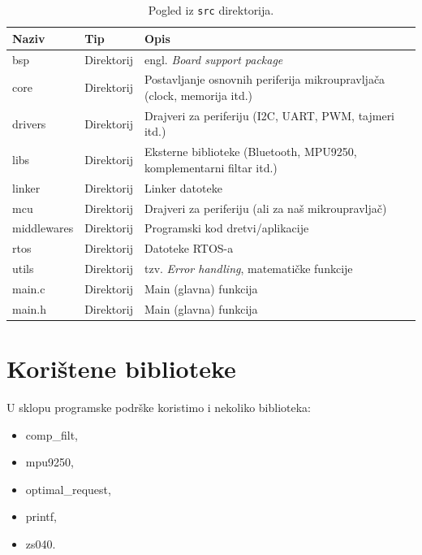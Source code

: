 \documentclass[times, utf8, diplomski, numeric]{templates/template}
\begin{document}
{{        \begin{table}[htb]
        \caption{Pogled iz \texttt{src} direktorija.}
        \label{tbl:pogled_iz_src_direktorija}
        \centering
        \begin{tabular}{lll} 
        \toprule
        Naziv & Tip & Opis \\ 
        \midrule
        bsp         & Direktorij & engl. \emph{Board support package} \\
        core        & Direktorij & Postavljanje osnovnih periferija mikroupravljača (clock, memorija itd.) \\
        drivers     & Direktorij & Drajveri za periferiju (I2C, UART, PWM, tajmeri itd.) \\
        libs        & Direktorij & Eksterne biblioteke (Bluetooth, MPU9250, komplementarni filtar itd.) \\
        linker      & Direktorij & Linker datoteke \\
        mcu         & Direktorij & Drajveri za periferiju (ali za naš mikroupravljač) \\
        middlewares & Direktorij & Programski kod dretvi/aplikacije \\
        rtos        & Direktorij & Datoteke RTOS-a \\
        utils       & Direktorij & tzv. \emph{Error handling}, matematičke funkcije \\
        main.c      & Direktorij & Main (glavna) funkcija \\
        main.h      & Direktorij & Main (glavna) funkcija \\
        \bottomrule
        \end{tabular}
        \end{table}
    }
    
    \section{Korištene biblioteke}{
        U sklopu programske podrške koristimo i nekoliko biblioteka:

        \begin{itemize}
        \item comp\_filt,
        \item mpu9250,
        \item optimal\_request,
        \item printf,
        \item zs040.
        \end{itemize}

}}
\end{document}
